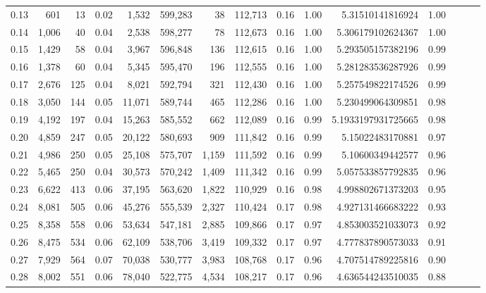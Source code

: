 \begin{tabular}{rrrrrrrrrrrrrrr}
0.13 &     601 &     13 &  0.02 &    1,532 &  599,283 &       38 &  112,713 &  0.16 &  1.00 &        5.31510141816924 &      1.00 \\
0.14 &   1,006 &     40 &  0.04 &    2,538 &  598,277 &       78 &  112,673 &  0.16 &  1.00 &       5.306179102624367 &      1.00 \\
0.15 &   1,429 &     58 &  0.04 &    3,967 &  596,848 &      136 &  112,615 &  0.16 &  1.00 &       5.293505157382196 &      0.99 \\
0.16 &   1,378 &     60 &  0.04 &    5,345 &  595,470 &      196 &  112,555 &  0.16 &  1.00 &       5.281283536287926 &      0.99 \\
0.17 &   2,676 &    125 &  0.04 &    8,021 &  592,794 &      321 &  112,430 &  0.16 &  1.00 &       5.257549822174526 &      0.99 \\
0.18 &   3,050 &    144 &  0.05 &   11,071 &  589,744 &      465 &  112,286 &  0.16 &  1.00 &       5.230499064309851 &      0.98 \\
0.19 &   4,192 &    197 &  0.04 &   15,263 &  585,552 &      662 &  112,089 &  0.16 &  0.99 &      5.1933197931725665 &      0.98 \\
0.20 &   4,859 &    247 &  0.05 &   20,122 &  580,693 &      909 &  111,842 &  0.16 &  0.99 &        5.15022483170881 &      0.97 \\
0.21 &   4,986 &    250 &  0.05 &   25,108 &  575,707 &    1,159 &  111,592 &  0.16 &  0.99 &        5.10600349442577 &      0.96 \\
0.22 &   5,465 &    250 &  0.04 &   30,573 &  570,242 &    1,409 &  111,342 &  0.16 &  0.99 &       5.057533857792835 &      0.96 \\
0.23 &   6,622 &    413 &  0.06 &   37,195 &  563,620 &    1,822 &  110,929 &  0.16 &  0.98 &       4.998802671373203 &      0.95 \\
0.24 &   8,081 &    505 &  0.06 &   45,276 &  555,539 &    2,327 &  110,424 &  0.17 &  0.98 &       4.927131466683222 &      0.93 \\
0.25 &   8,358 &    558 &  0.06 &   53,634 &  547,181 &    2,885 &  109,866 &  0.17 &  0.97 &       4.853003521033073 &      0.92 \\
0.26 &   8,475 &    534 &  0.06 &   62,109 &  538,706 &    3,419 &  109,332 &  0.17 &  0.97 &       4.777837890573033 &      0.91 \\
0.27 &   7,929 &    564 &  0.07 &   70,038 &  530,777 &    3,983 &  108,768 &  0.17 &  0.96 &       4.707514789225816 &      0.90 \\
0.28 &   8,002 &    551 &  0.06 &   78,040 &  522,775 &    4,534 &  108,217 &  0.17 &  0.96 &       4.636544243510035 &      0.88 \\

\end{tabular}
